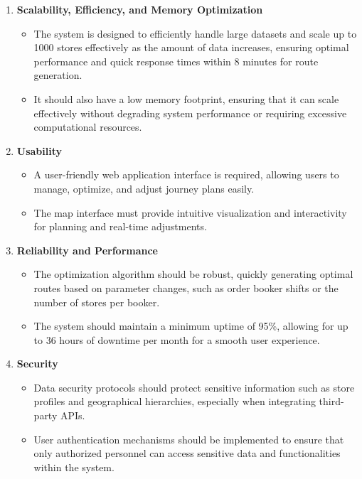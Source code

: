 \begin{enumerate}
    \item \textbf{Scalability, Efficiency, and Memory Optimization}
    \begin{itemize}
        \item The system is designed to efficiently handle large datasets and scale up to 1000 stores effectively as the amount of data increases, ensuring optimal performance and quick response times within 8 minutes for route generation.
        \item It should also have a low memory footprint, ensuring that it can scale effectively without degrading system performance or requiring excessive computational resources.
    \end{itemize}
    
    \item \textbf{Usability}
    \begin{itemize}
        \item A user-friendly web application interface is required, allowing users to manage, optimize, and adjust journey plans easily.
        \item The map interface must provide intuitive visualization and interactivity for planning and real-time adjustments.
    \end{itemize}
    
    \item \textbf{Reliability and Performance}
    \begin{itemize}
        \item The optimization algorithm should be robust, quickly generating optimal routes based on parameter changes, such as order booker shifts or the number of stores per booker.
        \item The system should maintain a minimum uptime of 95\%, allowing for up to 36 hours of downtime per month for a smooth user experience.
        
    \end{itemize}
    
    \item \textbf{Security}
    \begin{itemize}
        \item Data security protocols should protect sensitive information such as store profiles and geographical hierarchies, especially when integrating third-party APIs.
        \item User authentication mechanisms should be implemented to ensure that only authorized personnel can access sensitive data and functionalities within the system.


\end{itemize}
\end{enumerate}
